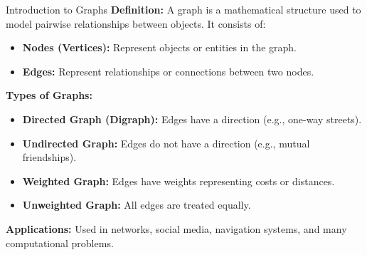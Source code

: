 \documentclass{beamer}
\begin{document}
\begin{frame}{Introduction to Graphs}
    \textbf{Definition:}  
    A graph is a mathematical structure used to model pairwise relationships between objects. It consists of:  
    \begin{itemize}
        \item \textbf{Nodes (Vertices):} Represent objects or entities in the graph.
        \item \textbf{Edges:} Represent relationships or connections between two nodes.
    \end{itemize}
    
    \textbf{Types of Graphs:}
    \begin{itemize}
        \item \textbf{Directed Graph (Digraph):} Edges have a direction (e.g., one-way streets).
        \item \textbf{Undirected Graph:} Edges do not have a direction (e.g., mutual friendships).
        \item \textbf{Weighted Graph:} Edges have weights representing costs or distances.
        \item \textbf{Unweighted Graph:} All edges are treated equally.
    \end{itemize}
    
    \textbf{Applications:} Used in networks, social media, navigation systems, and many computational problems.
\end{frame}
\end{document}
